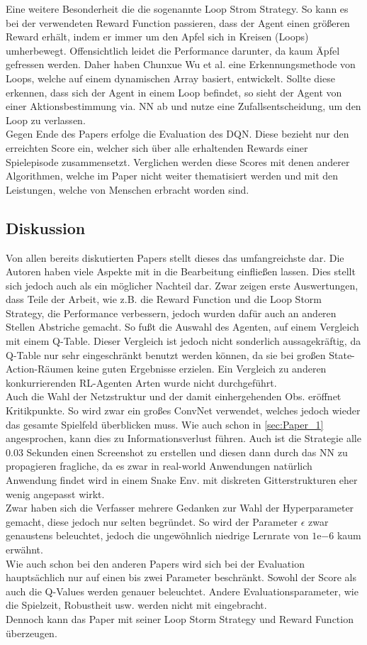 Eine weitere Besonderheit die die sogenannte Loop Strom Strategy. So kann es bei der verwendeten Reward Function passieren, dass der Agent einen größeren Reward erhält, indem er immer um den Apfel sich in Kreisen (Loops) umherbewegt. Offensichtlich leidet die Performance darunter, da kaum Äpfel gefressen werden. Daher haben Chunxue Wu et al. eine Erkennungsmethode von Loops, welche auf einem dynamischen Array basiert, entwickelt. Sollte diese erkennen, dass sich der Agent in einem Loop befindet, so sieht der Agent von einer Aktionsbestimmung via. NN ab und nutze eine Zufallsentscheidung, um den Loop zu verlassen.\\
Gegen Ende des Papers erfolge die Evaluation des DQN. Diese bezieht nur den erreichten Score ein, welcher sich über alle erhaltenden Rewards einer Spielepisode zusammensetzt. Verglichen werden diese Scores mit denen anderer Algorithmen, welche im Paper nicht weiter thematisiert werden und mit den Leistungen, welche von Menschen erbracht worden sind.

\subsection{Diskussion}
Von allen bereits diskutierten Papers stellt dieses das umfangreichste dar. Die Autoren haben viele Aspekte mit in die Bearbeitung einfließen lassen. Dies stellt sich jedoch auch als ein möglicher Nachteil dar. Zwar zeigen erste Auswertungen, dass Teile der Arbeit, wie z.B. die Reward Function und die Loop Storm Strategy, die Performance verbessern, jedoch wurden dafür auch an anderen Stellen Abstriche gemacht. So fußt die Auswahl des Agenten, auf einem Vergleich mit einem Q-Table. Dieser Vergleich ist jedoch nicht sonderlich aussagekräftig, da Q-Table nur sehr eingeschränkt benutzt werden können, da sie bei großen State-Action-Räumen keine guten Ergebnisse erzielen. Ein Vergleich zu anderen konkurrierenden RL-Agenten Arten wurde nicht durchgeführt.\\
Auch die Wahl der Netzstruktur und der damit einhergehenden Obs. eröffnet Kritikpunkte. So wird zwar ein großes ConvNet verwendet, welches jedoch wieder das gesamte Spielfeld überblicken muss. Wie auch schon in \ref{sec:Paper_1} angesprochen, kann dies zu Informationsverlust führen. Auch ist die Strategie alle 0.03 Sekunden einen Screenshot zu erstellen und diesen dann durch das NN zu propagieren fragliche, da es zwar in real-world Anwendungen natürlich Anwendung findet wird in einem Snake Env. mit diskreten Gitterstrukturen eher wenig angepasst wirkt.\\
Zwar haben sich die Verfasser mehrere Gedanken zur Wahl der Hyperparameter gemacht, diese jedoch nur selten begründet. So wird der Parameter $\epsilon$ zwar genaustens beleuchtet, jedoch die ungewöhnlich niedrige Lernrate von $1\mathrm{e}{-6}$ kaum erwähnt.\\
Wie auch schon bei den anderen Papers wird sich bei der Evaluation hauptsächlich nur auf einen bis zwei Parameter beschränkt. Sowohl der Score als auch die Q-Values werden genauer beleuchtet. Andere Evaluationsparameter, wie die Spielzeit, Robustheit usw. werden nicht mit eingebracht.\\
Dennoch kann das Paper mit seiner Loop Storm Strategy und Reward Function überzeugen.

